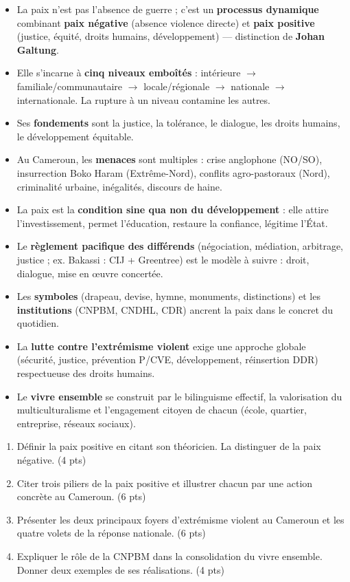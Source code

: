 \documentclass[11pt]{article}
\begin{document}
\begin{aretenir}
\begin{itemize}
    \item La paix n'est pas l'absence de guerre ; c'est un \textbf{processus dynamique} combinant \textbf{paix négative} (absence violence directe) et \textbf{paix positive} (justice, équité, droits humains, développement) — distinction de \textbf{Johan Galtung}.
    \item Elle s'incarne à \textbf{cinq niveaux emboîtés} : intérieure $\rightarrow$ familiale/communautaire $\rightarrow$ locale/régionale $\rightarrow$ nationale $\rightarrow$ internationale. La rupture à un niveau contamine les autres.
    \item Ses \textbf{fondements} sont la justice, la tolérance, le dialogue, les droits humains, le développement équitable.
    \item Au Cameroun, les \textbf{menaces} sont multiples : crise anglophone (NO/SO), insurrection Boko Haram (Extrême-Nord), conflits agro-pastoraux (Nord), criminalité urbaine, inégalités, discours de haine.
    \item La paix est la \textbf{condition sine qua non du développement} : elle attire l'investissement, permet l'éducation, restaure la confiance, légitime l'État.
    \item Le \textbf{règlement pacifique des différends} (négociation, médiation, arbitrage, justice ; ex. Bakassi : CIJ + Greentree) est le modèle à suivre : droit, dialogue, mise en œuvre concertée.
    \item Les \textbf{symboles} (drapeau, devise, hymne, monuments, distinctions) et les \textbf{institutions} (CNPBM, CNDHL, CDR) ancrent la paix dans le concret du quotidien.
    \item La \textbf{lutte contre l'extrémisme violent} exige une approche globale (sécurité, justice, prévention P/CVE, développement, réinsertion DDR) respectueuse des droits humains.
    \item Le \textbf{vivre ensemble} se construit par le bilinguisme effectif, la valorisation du multiculturalisme et l'engagement citoyen de chacun (école, quartier, entreprise, réseaux sociaux).
\end{itemize}
\end{aretenir}

\begin{exercice}
\begin{enumerate}
    \item Définir la paix positive en citant son théoricien. La distinguer de la paix négative. (4 pts)
    \item Citer trois piliers de la paix positive et illustrer chacun par une action concrète au Cameroun. (6 pts)
    \item Présenter les deux principaux foyers d'extrémisme violent au Cameroun et les quatre volets de la réponse nationale. (6 pts)
    \item Expliquer le rôle de la CNPBM dans la consolidation du vivre ensemble. Donner deux exemples de ses réalisations. (4 pts)
\end{enumerate}
\end{exercice}
\end{document}
